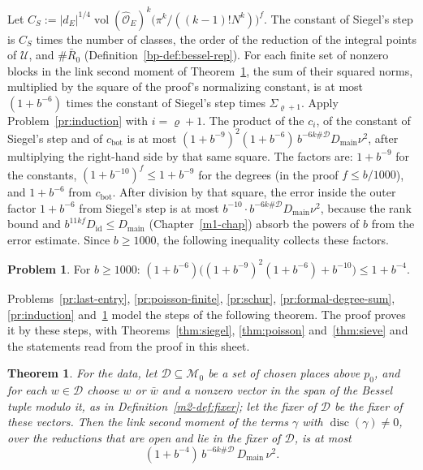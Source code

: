 \documentclass[reqno]{amsart}
\newcounter{chap}
\theoremstyle{definition}
\newtheorem{problem}{Problem}[section]
\theoremstyle{plain}
\newtheorem{theorem}{Theorem}[section]
\theoremstyle{remark}
\newcommand{\Uc}{\mathcal{U}}
\newcommand{\Dc}{\mathcal{D}}
\newcommand{\cMc}{\mathcal{M}}
\newcommand{\Oh}{\hat{\mathcal O}_E}
\newcommand{\disc}{\operatorname{disc}}
\newcommand{\vol}{\operatorname{vol}}
\newcommand{\Dm}{D_{\mathrm{main}}}
\newcommand{\Di}{D_{\mathrm{id}}}
\begin{document}
Let \(C_S:=\lvert d_E\rvert^{1/4}\vol(\Oh)^k\bigl(\pi^k/((k-1)!N^k)\bigr)^f\).  The constant of Siegel's step is \(C_S\) times the number of classes, the order of the reduction of the integral points of \(\Uc\), and \(\#\bar R_0\) (Definition~\ref{bp-def:bessel-rep}).  For each finite set of nonzero blocks in the link second moment of Theorem~\ref{thm:open}, the sum of their squared norms, multiplied by the square of the proof's normalizing constant, is at most \((1+b^{-6})\) times the constant of Siegel's step times \(\Sigma_{\varrho+1}\).  Apply Problem~\ref{pr:induction} with \(i=\varrho+1\).  The product of the \(c_i\), of the constant of Siegel's step and of \(c_{\mathrm{bot}}\) is at most \((1+b^{-9})^2(1+b^{-6})\,b^{-6k\#\Dc}\Dm\nu^2\), after multiplying the right-hand side by that same square.  The factors are: \(1+b^{-9}\) for the constants, \((1+b^{-10})^f\le1+b^{-9}\) for the degrees (in the proof \(f\le b/1000\)), and \(1+b^{-6}\) from \(c_{\mathrm{bot}}\).  After division by that square, the error inside the outer factor \(1+b^{-6}\) from Siegel's step is at most \(b^{-10}\cdot b^{-6k\#\Dc}\Dm\nu^2\), because the rank bound and \(b^{11kf}\Di\le\Dm\) (Chapter~\ref{m1-chap}) absorb the powers of \(b\) from the error estimate.  Since \(b\ge1000\), the following inequality collects these factors.

\begin{problem}\label{pr:constants}
For \(b\ge1000\): \((1+b^{-6})\bigl((1+b^{-9})^2(1+b^{-6})+b^{-10}\bigr)\le1+b^{-4}\).
\end{problem}

Problems~\ref{pr:last-entry}, \ref{pr:poisson-finite}, \ref{pr:schur}, \ref{pr:formal-degree-sum}, \ref{pr:induction} and~\ref{pr:constants} model the steps of the following theorem.  The proof proves it by these steps, with Theorems~\ref{thm:siegel}, \ref{thm:poisson} and~\ref{thm:sieve} and the statements read from the proof in this sheet.

\begin{theorem}\label{thm:open}
For the data, let \(\Dc\subseteq\cMc_0\) be a set of chosen places above \(p_0\), and for each \(w\in\Dc\) choose \(w\) or \(\bar w\) and a nonzero vector in the span of the Bessel tuple modulo it, as in Definition~\ref{m2-def:fixer}; let the fixer of \(\Dc\) be the fixer of these vectors.  Then the link second moment of the terms \(\gamma\) with \(\disc(\gamma)\ne0\), over the reductions that are open and lie in the fixer of \(\Dc\), is at most
\[
 (1+b^{-4})\,b^{-6k\#\Dc}\,\Dm\,\nu^2 .
\]
\end{theorem}
\end{document}
